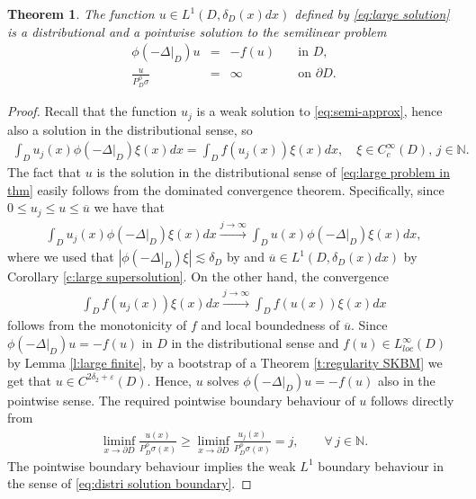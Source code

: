 \documentclass[12pt,a4paper,onecolumn]{amsart}
\newtheorem{thm}{Theorem}[section]
\theoremstyle{definition}
\newcommand{\N}{\mathbb{N}}
\newcommand{\1}{\mathbf 1}
\newcommand{\LLL}{L^1(D,\de(x)dx)}
\newcommand{\Lo}{\phi(-\left.\Delta\right\vert_{D})}
\newcommand{\PDfi}{P^\phi_{ D}}
\newcommand{\PDFI}{\PDfi}
\newcommand{\de}{\delta_D}
\numberwithin{equation}{section}
\begin{document}
\begin{thm}\label{t:large solution}
	 The function $u\in \LLL$ defined by \eqref{eq:large solution} is a distributional and a pointwise    solution to the semilinear problem
	\begin{equation}\label{eq:large problem in thm}
		\begin{array}{rcll}
			\Lo u&=& - f(u)& \quad \text{in } D,\\
			\frac{u}{\PDFI\sigma}&=&\infty&\quad \text{on }\partial D.
		\end{array}
	\end{equation}
\end{thm}
\begin{proof}
	Recall that the function $u_j$ is a weak solution to \eqref{eq:semi-approx}, hence also a solution in the distributional sense, so
    \begin{align*}
		\int_D u_j(x) \Lo\xi(x)dx=\int_D f(u_j(x)) \xi(x)dx,\quad \xi\in C_c^\infty(D),\,j\in \N.
	\end{align*}
    The fact that $u$ is the solution in the distributional sense of \eqref{eq:large problem in thm} easily follows from the dominated convergence theorem. Specifically, since $0\le u_j\le u\le \overline{u}$ we have that
	\begin{align}\label{eq:large distrib eq1}
		\int_D u_j(x) \Lo\xi(x)dx\overset{j\to \infty}{\longrightarrow}		\int_D u(x) \Lo\xi(x)dx,
	\end{align}
	where we used that $|\Lo \xi|\lesssim \de$ by \cite[Lemma 2.11]{Bio23} and $\overline{u}\in \LLL$ by Corollary \ref{c:large supersolution}. On the other hand, the convergence
	\begin{align}\label{eq:large distrib eq2}
		\int_D f(u_j(x)) \xi(x)dx\overset{j\to \infty}{\longrightarrow}		\int_D f(u(x)) \xi(x)dx
	\end{align}
	follows from the monotonicity of $f$ and local boundedness of $\overline u$. Since $\Lo u= - f(u)$ in $D$ in the distributional sense and $f(u)\in L^{\infty}_{loc}(D)$ by Lemma \ref{l:large finite}, by a bootstrap of a Theorem \ref{t:regularity SKBM} we get that $u\in C^{2\delta_2+\varepsilon}(D)$. Hence, $u$ solves $\Lo u= - f(u)$ also in the pointwise sense. The required  pointwise  boundary behaviour of $u$ follows directly from
	\begin{align*}
		\liminf_{x\to\partial D}\frac{u(x)}{\PDFI\sigma(x)}\ge \liminf_{x\to\partial D}\frac{u_j(x)}{\PDFI\sigma(x)}=j, \qquad \forall\,j\in\N.
	\end{align*}
    The pointwise boundary behaviour implies the weak $L^1$ boundary behaviour in the sense of \eqref{eq:distri solution boundary}. 
\end{proof}
\end{document}
